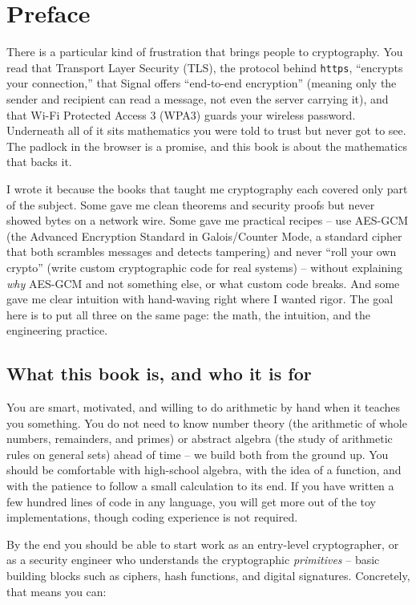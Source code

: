 \chapter*{Preface}

There is a particular kind of frustration that brings people to cryptography. You read that Transport Layer Security (TLS), the protocol behind \texttt{https}, ``encrypts your connection,'' that Signal offers ``end-to-end encryption'' (meaning only the sender and recipient can read a message, not even the server carrying it), and that Wi-Fi Protected Access 3 (WPA3) guards your wireless password. Underneath all of it sits mathematics you were told to trust but never got to see. The padlock in the browser is a promise, and this book is about the mathematics that backs it.

I wrote it because the books that taught me cryptography each covered only part of the subject. Some gave me clean theorems and security proofs but never showed bytes on a network wire. Some gave me practical recipes -- use AES-GCM (the Advanced Encryption Standard in Galois/Counter Mode, a standard cipher that both scrambles messages and detects tampering) and never ``roll your own crypto'' (write custom cryptographic code for real systems) -- without explaining \emph{why} AES-GCM and not something else, or what custom code breaks. And some gave me clear intuition with hand-waving right where I wanted rigor. The goal here is to put all three on the same page: the math, the intuition, and the engineering practice.

\section*{What this book is, and who it is for}

You are smart, motivated, and willing to do arithmetic by hand when it teaches you something. You do not need to know number theory (the arithmetic of whole numbers, remainders, and primes) or abstract algebra (the study of arithmetic rules on general sets) ahead of time -- we build both from the ground up. You should be comfortable with high-school algebra, with the idea of a function, and with the patience to follow a small calculation to its end. If you have written a few hundred lines of code in any language, you will get more out of the toy implementations, though coding experience is not required.

By the end you should be able to start work as an entry-level cryptographer, or as a security engineer who understands the cryptographic \emph{primitives} -- basic building blocks such as ciphers, hash functions, and digital signatures. Concretely, that means you can:

